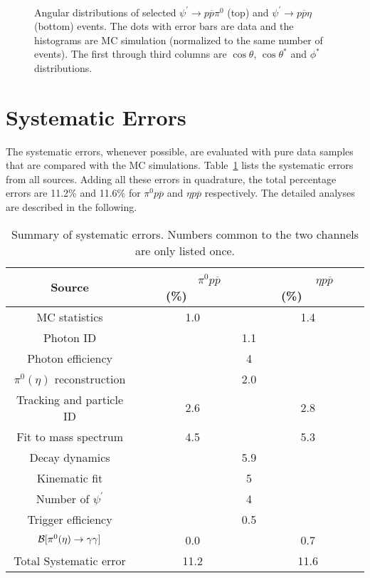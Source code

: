 \documentclass[prd,twocolumn,showpacs,amsmath,amssymb]{revtex4}
\newcommand{\BR}{{\cal B}}
\newcommand{\psip}{\psi^\prime}
\newcommand{\piz}{\pi^0}
\newcommand{\ppb}{p\overline{p}}
\newcommand{\ra}{\rightarrow}
\newcommand{\pspto}{\psi^\prime \rightarrow }
\newcommand{\g}{\gamma}
\begin{document}
\begin{figure*}[htbp]
\centerline{\hbox{
}} \caption{Angular
distributions of selected $\pspto \ppb \piz$ (top) and $\pspto
\ppb \eta$ (bottom) events. The dots with error bars are data and
the histograms are MC simulation (normalized to the same number of
events). The first through third columns are $\cos\theta$,
$\cos\theta^*$ and $\phi^*$ distributions.} \label{angdtmc}
\end{figure*}

\section{Systematic Errors}

The systematic errors, whenever possible, are evaluated with pure
data samples that are compared with the MC simulations.
Table~\ref{syst} lists the systematic errors from all sources.
Adding all these errors in quadrature, the total percentage errors
are 11.2\% and 11.6\% for $\piz\ppb$ and $\eta\ppb$ respectively.
The detailed analyses are described in the following.

\begin{table}[htbp]
\caption{Summary of systematic errors. Numbers common to the
two channels are only listed once.}
\begin{center}
\begin{tabular}{c|cc}\hline\hline
 Source         & ~~~~~$\piz\ppb$ (\%)~~~~~ & ~~~~~$\eta\ppb$ (\%)~~~~~\\\hline
 MC statistics  &  1.0       &  1.4  \\
 Photon ID      & \multicolumn{2}{c}{1.1}\\
 Photon efficiency    & \multicolumn{2}{c}{4}  \\
 $\piz(\eta)$ reconstruction &\multicolumn{2}{c}{2.0}   \\
 Tracking and particle ID
                &  2.6       &  2.8 \\
 Fit to mass spectrum    &  4.5       &  5.3 \\
 Decay dynamics    &\multicolumn{2}{c}{5.9} \\
 Kinematic fit         & \multicolumn{2}{c}{5}    \\
 Number of $\psip$ & \multicolumn{2}{c}{4}\\
 Trigger efficiency &\multicolumn{2}{c}{0.5}\\
 $\BR[\piz(\eta) \ra \g\g]$
                &  0.0       &  0.7 \\\hline
 Total Systematic error
                & 11.2       & 11.6 \\\hline\hline
\end{tabular}
\end{center}
\label{syst}
\end{table}
\end{document}
